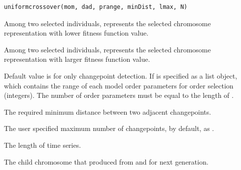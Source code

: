 \documentclass[a4paper]{book}
\begin{document}
%
\begin{Usage}
\begin{verbatim}
uniformcrossover(mom, dad, prange, minDist, lmax, N)
\end{verbatim}
\end{Usage}
%
\begin{Arguments}
\begin{ldescription}
\item[\code{mom}] Among two selected individuals,  represents the selected
chromosome representation with lower fitness function value.

\item[\code{dad}] Among two selected individuals,  represents the selected
chromosome representation with larger fitness function value.

\item[\code{prange}] Default value is  for only changepoint detection. If
 is specified as a list object, which contains the range of
each model order parameters for order selection (integers). The number of
order parameters must be equal to the length of .

\item[\code{minDist}] The required minimum distance between two adjacent changepoints.

\item[\code{lmax}] The user specified maximum number of changepoints, by default,
as .

\item[\code{N}] The length of time series.
\end{ldescription}
\end{Arguments}
%
\begin{Value}
The child chromosome that produced from  and  for
next generation.
\end{Value}
\printindex{}
\end{document}
